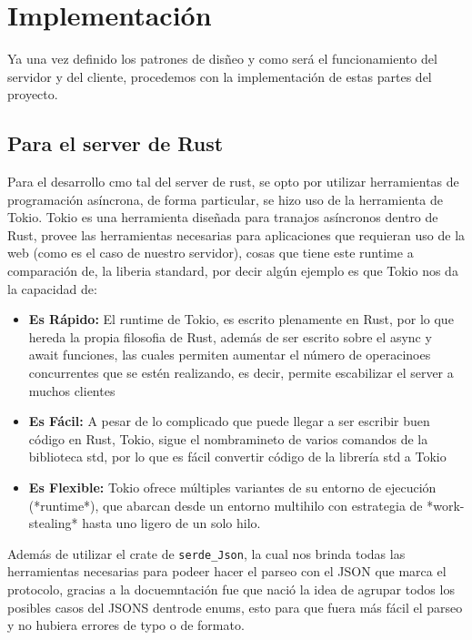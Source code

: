 \section{Implementación}

Ya una vez definido los patrones de disñeo y como será el funcionamiento del servidor y del cliente, procedemos con la implementación de estas partes del proyecto.

\subsection{Para el server de Rust}
Para el desarrollo cmo tal del server de rust, se opto por utilizar herramientas de programación asíncrona, de forma particular, se hizo uso de la herramienta de Tokio.
Tokio es una herramienta diseñada para tranajos asíncronos dentro de Rust, provee las herramientas necesarias para aplicaciones que requieran uso de la web (como es el caso de nuestro servidor), cosas que tiene este runtime a comparación de, la liberia standard, por decir algún ejemplo es que Tokio nos da la capacidad de: 

\begin{itemize}
    \item \textbf{Es Rápido: } El runtime de Tokio, es escrito plenamente en Rust, por lo que hereda la propia filosofia de Rust, además de ser escrito sobre el async y await funciones, las cuales permiten aumentar el número de operacinoes concurrentes que se estén realizando, es decir, permite escabilizar el server a muchos clientes
    \item \textbf{Es Fácil: } A pesar de lo complicado que puede llegar a ser escribir buen código en Rust, Tokio, sigue el nombramineto de varios comandos de la biblioteca std, por lo que es  fácil convertir código de la librería std a Tokio 
    \item \textbf{Es Flexible: } Tokio ofrece múltiples variantes de su entorno de ejecución (*runtime*), que abarcan desde un entorno multihilo con estrategia de *work-stealing* hasta uno ligero de un solo hilo. 
\end{itemize}

Además de utilizar el crate de \texttt{serde\_Json}, la cual nos brinda todas las herramientas necesarias para podeer hacer el parseo con el JSON que marca el protocolo, gracias a la docuemntación fue que nació la idea de agrupar todos los posibles casos del JSONS dentrode enums, esto para que fuera más fácil el parseo y no hubiera errores de typo o de formato.

